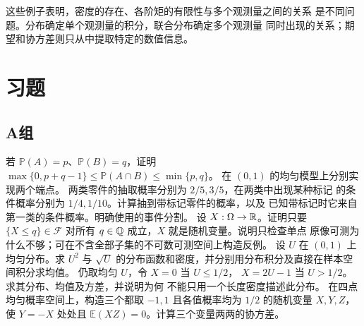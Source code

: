 这些例子表明，密度的存在、各阶矩的有限性与多个观测量之间的关系
是不同问题。分布确定单个观测量的积分，联合分布确定多个观测量
同时出现的关系；期望和协方差则只从中提取特定的数值信息。

\section*{习题}
\subsection*{A组}
\begin{enumerate}[label=\textbf{\thechapter.\arabic*.}]
若 \(\mathbb P(A)=p\)、\(\mathbb P(B)=q\)，证明
\(\max\{0,p+q-1\}\le\mathbb P(A\cap B)\le\min\{p,q\}\)。
在 \((0,1)\) 的均匀模型上分别实现两个端点。
两类零件的抽取概率分别为 \(2/5,3/5\)，在两类中出现某种标记
的条件概率分别为 \(1/4,1/10\)。计算抽到带标记零件的概率，以及
已知带标记时它来自第一类的条件概率。明确使用的事件分割。
设 \(X:\Omega\to\mathbb{R}\)。证明只要 \(\{X\le q\}\in\mathcal F\)
对所有 \(q\in\mathbb{Q}\) 成立，\(X\) 就是随机变量。说明只检查单点
原像可测为什么不够；可在不含全部子集的不可数可测空间上构造反例。
设 \(U\) 在 \((0,1)\) 上均匀分布。求 \(U^2\) 与 \(\sqrt U\)
的分布函数和密度，并分别用分布积分及直接在样本空间积分求均值。
仍取均匀 \(U\)，令 \(X=0\) 当 \(U\le1/2\)，
\(X=2U-1\) 当 \(U>1/2\)。求其分布、均值及方差，并说明为何
不能只用一个长度密度描述此分布。
在四点均匀概率空间上，构造三个都取 \(-1,1\) 且各值概率均为
\(1/2\) 的随机变量 \(X,Y,Z\)，使 \(Y=-X\) 处处且
\(\mathbb E(XZ)=0\)。计算三个变量两两的协方差。
\end{enumerate}

